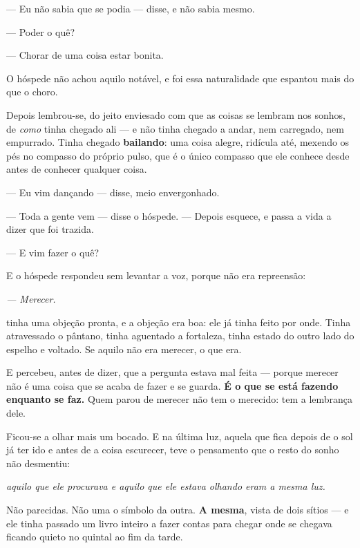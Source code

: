 \documentclass[livro.tex]{subfiles}
\begin{document}
\medskip
\noindent --- Eu não sabia que se podia --- disse, e não sabia mesmo.

--- Poder o quê?

--- Chorar de uma coisa estar bonita.

\medskip
\noindent O hóspede não achou aquilo notável, e foi essa naturalidade que
espantou \Ben mais do que o choro.

\medskip
\noindent Depois lembrou-se, do jeito enviesado com que as coisas se lembram
nos sonhos, de \emph{como} tinha chegado ali --- e não tinha chegado a andar,
nem carregado, nem empurrado. Tinha chegado \textbf{bailando}: uma coisa
alegre, ridícula até, mexendo os pés no compasso do próprio pulso, que é o
único compasso que ele conhece desde antes de conhecer qualquer coisa.

\medskip
\noindent --- Eu vim dançando --- disse, meio envergonhado.

--- Toda a gente vem --- disse o hóspede. --- Depois esquece, e passa a vida a
dizer que foi trazida.

\medskip
\noindent --- E vim fazer o quê?

E o hóspede respondeu sem levantar a voz, porque não era repreensão:

\begin{center}
\emph{--- Merecer.}
\end{center}

\medskip
\noindent \Ben tinha uma objeção pronta, e a objeção era boa: ele já tinha
feito por onde. Tinha atravessado o pântano, tinha aguentado a fortaleza,
tinha estado do outro lado do espelho e voltado. Se aquilo não era merecer,
o que era.

E percebeu, antes de dizer, que a pergunta estava mal feita --- porque merecer
não é uma coisa que se acaba de fazer e se guarda. \textbf{É o que se está
fazendo enquanto se faz.} Quem parou de merecer não tem o merecido: tem a
lembrança dele.

\medskip
\noindent Ficou-se a olhar mais um bocado. E na última luz, aquela que fica
depois de o sol já ter ido e antes de a coisa escurecer, teve o pensamento que
o resto do sonho não desmentiu:

\begin{center}
\emph{aquilo que ele procurava e aquilo que ele estava olhando eram a mesma
luz.}
\end{center}

\noindent Não parecidas. Não uma o símbolo da outra. \textbf{A mesma}, vista de
dois sítios --- e ele tinha passado um livro inteiro a fazer contas para chegar
onde se chegava ficando quieto no quintal ao fim da tarde.
\end{document}
